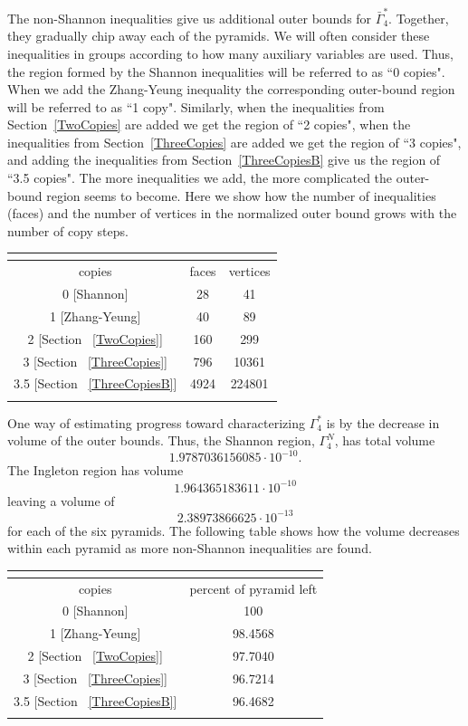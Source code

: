 \documentclass[10pt,journal]{IEEEtran}
\begin{document}
The non-Shannon inequalities give us additional outer bounds for $\bar\Gamma^*_4$.
Together, they gradually chip away each of the pyramids.
We will often consider these inequalities in groups according to how many auxiliary variables are used.
Thus, the region formed by the Shannon inequalities will be referred to as ``0 copies".  When we add the
Zhang-Yeung inequality the corresponding outer-bound region will be referred to as ``1 copy".
Similarly, when the inequalities from Section~\ref{TwoCopies} are added we get the region of ``2 copies",
when the inequalities from Section~\ref{ThreeCopies} are added  we get the region of ``3 copies",
and adding the inequalities from Section~\ref{ThreeCopiesB} give us the region of ``3.5 copies".
The more
inequalities we add, the more complicated the outer-bound region seems to become.  Here we show how the number of inequalities (faces)
and the number of vertices in the normalized outer bound grows with the number of copy steps.

\begin{tabular}{|c|c|c|}
\multicolumn{3}{c}{}\\
   \hline
  copies  & faces & vertices \\
   \hline
  0 [Shannon]& 28 & 41 \\
  1 [Zhang-Yeung]& 40 & 89 \\
  2 [Section ~\ref{TwoCopies}]& 160 & 299 \\
  3 [Section ~\ref{ThreeCopies}]& 796 & 10361 \\
  3.5 [Section ~\ref{ThreeCopiesB}]& 4924 & 224801 \\
  \hline
  \multicolumn{3}{c}{}
\end{tabular}

One way of estimating progress toward characterizing $\Gamma^*_4$ is by the decrease in volume
of the outer bounds.
Thus, the Shannon region, $\Gamma^N_4$, has total volume $$1.9787036156085\cdot 10^{-10}.$$
The Ingleton region has volume $$1.964365183611\cdot 10^{-10}$$ leaving a volume of
$$ 2.38973866625 \cdot  10^{-13}$$ for each of the six pyramids.  The following table shows how
the volume decreases within each pyramid as more non-Shannon inequalities are found.

\begin{tabular}{|c|c|}
\multicolumn{2}{c}{}\\
  \hline
  copies  & percent of pyramid left\\
   \hline
  0 [Shannon]& 100\\
  1 [Zhang-Yeung]& 98.4568\\
  2 [Section ~\ref{TwoCopies}]& 97.7040\\
  3 [Section ~\ref{ThreeCopies}]& 96.7214\\
  3.5 [Section ~\ref{ThreeCopiesB}]& 96.4682\\
  \hline
  \multicolumn{2}{c}{}
\end{tabular}
\end{document}
